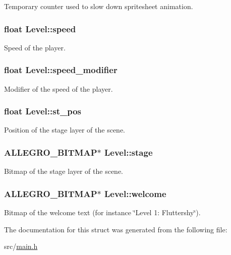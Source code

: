 \-Temporary counter used to slow down spritesheet animation. \hypertarget{structLevel_a936a1d131d1e056878474ca831c5e88f}{
\subsubsection[{speed}]{\setlength{\rightskip}{0pt plus 5cm}float {\bf \-Level\-::speed}}}\label{structLevel_a936a1d131d1e056878474ca831c5e88f}
\-Speed of the player. \hypertarget{structLevel_a0f6fa70a2e0b85437dc1973d1409381f}{
\subsubsection[{speed\-\_\-modifier}]{\setlength{\rightskip}{0pt plus 5cm}float {\bf \-Level\-::speed\-\_\-modifier}}}\label{structLevel_a0f6fa70a2e0b85437dc1973d1409381f}
\-Modifier of the speed of the player. \hypertarget{structLevel_ab13f799d9e2e06a04debbd97676fb512}{
\subsubsection[{st\-\_\-pos}]{\setlength{\rightskip}{0pt plus 5cm}float {\bf \-Level\-::st\-\_\-pos}}}\label{structLevel_ab13f799d9e2e06a04debbd97676fb512}
\-Position of the stage layer of the scene. \hypertarget{structLevel_ad412b858a4e688114dd89a44ecb005bb}{
\subsubsection[{stage}]{\setlength{\rightskip}{0pt plus 5cm}\-A\-L\-L\-E\-G\-R\-O\-\_\-\-B\-I\-T\-M\-A\-P$\ast$ {\bf \-Level\-::stage}}}\label{structLevel_ad412b858a4e688114dd89a44ecb005bb}
\-Bitmap of the stage layer of the scene. \hypertarget{structLevel_a575fec7686bd94b5c35b15d73296c977}{
\subsubsection[{welcome}]{\setlength{\rightskip}{0pt plus 5cm}\-A\-L\-L\-E\-G\-R\-O\-\_\-\-B\-I\-T\-M\-A\-P$\ast$ {\bf \-Level\-::welcome}}}\label{structLevel_a575fec7686bd94b5c35b15d73296c977}
\-Bitmap of the welcome text (for instance \char`\"{}\-Level 1\-: Fluttershy\char`\"{}). 

\-The documentation for this struct was generated from the following file\-:\begin{DoxyCompactItemize}
\item 
src/\hyperlink{main_8h}{main.\-h}\end{DoxyCompactItemize}

